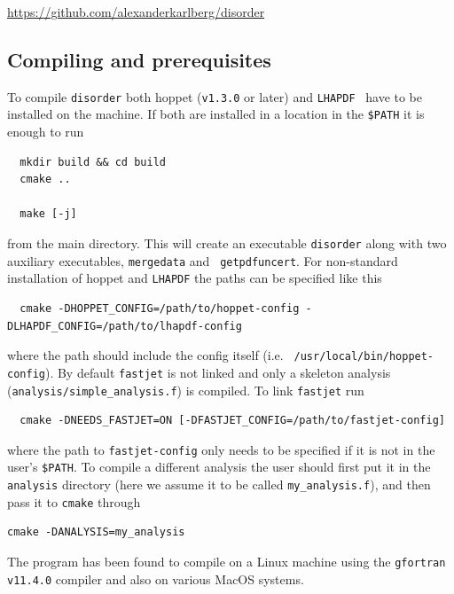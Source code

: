 \documentclass[submission, PhysCodeb]{SciPost}
\newcommand{\hoppet}{{\sc hoppet}}
\newcommand{\disorder}{{\tt disorder}}
\newcommand{\fastjet}{{\tt fastjet}}
\newcommand{\lhapdf}{{\tt LHAPDF}}
\begin{document}
\begin{center}\url{https://github.com/alexanderkarlberg/disorder}\end{center}

\subsection{Compiling and prerequisites}
To compile \disorder{} both \hoppet{} ({\tt v1.3.0} or later) and
\lhapdf{}~\cite{Buckley:2014ana} have to be installed on the
machine. If both are installed in a location in the {\tt \$PATH} it is
enough to run
\begin{lstlisting}
  mkdir build && cd build
  cmake ..

  make [-j]
\end{lstlisting}
from the main directory. This will create an executable \disorder{}
along with two auxiliary executables, {\tt mergedata} and {\tt
  getpdfuncert}. For non-standard installation of \hoppet{} and
\lhapdf{} the paths can be specified like this
\begin{lstlisting}
  cmake -DHOPPET_CONFIG=/path/to/hoppet-config -DLHAPDF_CONFIG=/path/to/lhapdf-config
\end{lstlisting}
where the path should include the config itself (i.e. {\tt
  /usr/local/bin/hoppet-config}). By default \fastjet{} is not linked
and only a skeleton analysis ({\tt analysis/simple\_analysis.f}) is
compiled. To link \fastjet{} run
\begin{lstlisting}
  cmake -DNEEDS_FASTJET=ON [-DFASTJET_CONFIG=/path/to/fastjet-config]
\end{lstlisting}
where the path to {\tt fastjet-config} only needs to be specified if
it is not in the user's {\tt \$PATH}. To compile a different analysis
the user should first put it in the {\tt analysis} directory (here we
assume it to be called {\tt my\_analysis.f}), and then pass it to
{\tt cmake} through
\begin{lstlisting}
cmake -DANALYSIS=my_analysis
\end{lstlisting}
The program has been found to compile on a Linux machine using the
{\tt gfortran v11.4.0} compiler and also on various MacOS systems.
\end{document}
